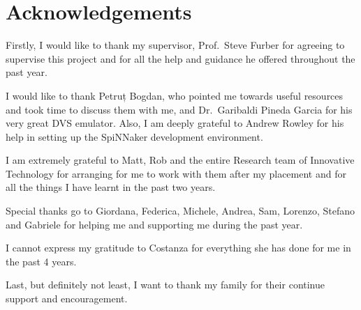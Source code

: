 \chapter*{Acknowledgements}
Firstly, I would like to thank my supervisor, Prof.\ Steve Furber for agreeing to supervise this project and for all the help and guidance he offered throughout the past year. 

I would like to thank Petruț Bogdan, who pointed me towards useful resources and took time to discuss them with me, and Dr.\ Garibaldi Pineda Garcia for his very great DVS emulator. Also, I am deeply grateful to Andrew Rowley for his help in setting up the SpiNNaker development environment. 

I am extremely grateful to Matt, Rob and the entire Research team of Innovative Technology for arranging for me to work with them after my placement and for all the things I have learnt in the past two years.

Special thanks go to Giordana, Federica, Michele, Andrea, Sam, Lorenzo, Stefano and Gabriele for helping me and supporting me during the past year. 

I cannot express my gratitude to Costanza for everything she has done for me in the past 4 years. 

Last, but definitely not least, I want to thank my family for their continue support and encouragement.